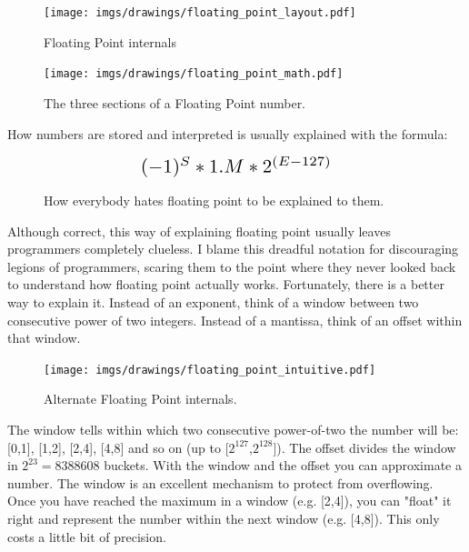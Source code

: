 \documentclass[book.tex]{subfiles}
\begin{document}
\begin{figure}[H]
\centering
\texttt{[image: imgs/drawings/floating\_point\_layout.pdf]}
\caption{Floating Point internals}
\end{figure}
  \bigskip



\begin{figure}[H]
\centering
\texttt{[image: imgs/drawings/floating\_point\_math.pdf]}
\caption{The three sections of a Floating Point number.}
\end{figure}
  \bigskip  


How numbers are stored and interpreted is usually explained with the formula:\\
\par
\begin{figure}[H]
\begin{equation*}\label{eq:fp}
\scalebox{1.5}{
$(-1)^S * 1.M * 2^{(E-127)}$
}
\end{equation*}
 \caption{How everybody hates floating point to be explained to them.}
\end{figure}
\bigskip  

Although correct, this way of explaining floating point usually leaves programmers completely clueless. I blame this dreadful notation for discouraging legions of programmers, scaring them to the point where they never looked back to understand how floating point actually works. Fortunately, there is a better way to explain it. Instead of an exponent, think of a window between two consecutive power of two integers. Instead of a mantissa, think of an offset within that window.\\ 
\par
  
\begin{figure}[H]
\centering
\texttt{[image: imgs/drawings/floating\_point\_intuitive.pdf]}
\caption{Alternate Floating Point internals.}
\end{figure}
  \bigskip  
The window tells within which two consecutive power-of-two the number will be: [0,1], [1,2], [2,4], [4,8] and so on (up to [$2^{127}$,$2^{128}$]). The offset divides the window in $ 2^{23} = 8388608 $  buckets. With the window and the offset you can approximate a number. The window is an excellent mechanism to protect from overflowing. Once you have reached the maximum in a window (e.g. [2,4]), you can "float" it right and represent the number within the next window (e.g. [4,8]). This only costs a little bit of precision.\\
\end{document}

